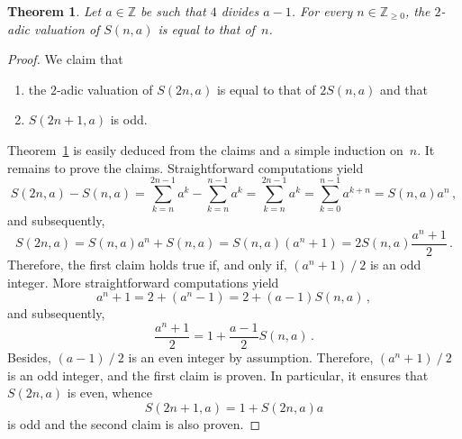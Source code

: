 \documentclass[12pt]{article}
\newcommand{\bZ}{\mathbb{Z}}
\newcommand{\bN}{\bZ_{\ge 0}}%
\newtheorem{theorem}{Theorem}
\theoremstyle{definition}
\begin{document}

\begin{theorem} \label{thm:2-adic-S}
  Let $a \in \bZ$ be such that $4$ divides $a - 1$.
  For every $n \in \bN$, the $2$-adic valuation of $S(n, a)$ is equal to that of~$n$.
\end{theorem}

\begin{proof}
  We claim that 
  \begin{enumerate}
  \item the $2$-adic valuation of $S(2n, a)$ is equal to that of $2 S(n, a)$ and that  
  \item $S(2n + 1, a)$ is odd.
  \end{enumerate} 
  Theorem~\ref{thm:2-adic-S} is easily deduced from the claims and a simple induction on~$n$.
  It remains to prove the claims.
  Straightforward computations yield
  $$
  S(2n, a) - S(n, a)
  = \sum_{k = n}^{2n - 1} a^k - \sum_{k = n}^{n - 1} a^k
  = \sum_{k = n}^{2n - 1} a^k
  = \sum_{k = 0}^{n - 1} a^{k + n} =  S(n, a) a^n \,,
  $$
  and subsequently,
  $$
  S(2 n, a) = S(n, a) a^n + S(n, a) = S(n, a) (a^n + 1) = 2 S(n, a) \frac{a^n + 1}{2} \,. 
  $$
  Therefore, the first claim holds true if, and only if, $(a^n + 1) \mathbin{/} 2$ is an odd integer.
  More straightforward computations yield
  $$
  a^n + 1  = 2 + (a^n - 1) = 2 + (a - 1) S(n, a) \,, 
  $$
  and subsequently,
  $$
  \frac{a^n + 1}{2} = 1 + \frac{a - 1}{2} S(n, a) \,. 
  $$
  Besides, $(a - 1) \mathbin{/} 2$ is an even integer by assumption.
  Therefore, $(a^n + 1) \mathbin{/} 2$ is an odd integer, and the first claim is proven.
  In particular, it ensures that $S(2n, a)$ is even,
  whence
  $$S(2n + 1, a) = 1 + S(2n, a) a$$
  is odd and the second claim is also proven.
\end{proof}


  
\end{document}
